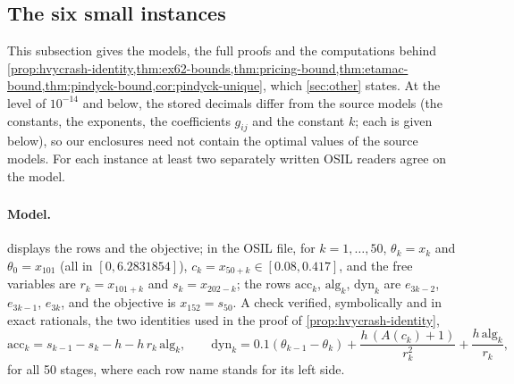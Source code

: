 \subsection{The six small instances}\label{app:small}

This subsection gives the models, the full proofs and the computations behind
\cref{prop:hvycrash-identity,thm:ex62-bounds,thm:pricing-bound,thm:etamac-bound,thm:pindyck-bound,cor:pindyck-unique}, which \cref{sec:other} states.
At the level of $10^{-14}$ and below, the stored decimals differ from the source models (the  constants, the  exponents, the  coefficients $g_{ij}$ and the  constant $k$; each is given below), so our enclosures need not contain the optimal values of the source models.
For each instance at least two separately written OSIL readers agree on the model.

\subsubsection{}\label{app:small-hvycrash}

\paragraph{Model.}
 displays the rows and the objective; in the OSIL file, for $k=1,\dots,50$,
$\theta_k=x_k$ and $\theta_0=x_{101}$ (all in $[0,6.2831854]$), $c_k=x_{50+k}\in[0.08,0.417]$, and the free variables are $r_k=x_{101+k}$ and $s_k=x_{202-k}$;
the rows $\text{acc}_k$, $\text{alg}_k$, $\text{dyn}_k$ are $e_{3k-2}$, $e_{3k-1}$, $e_{3k}$, and the objective is $x_{152}=s_{50}$.
A check verified, symbolically and in exact rationals, the two identities used in the proof of \cref{prop:hvycrash-identity},
\[
\text{acc}_k=s_{k-1}-s_k-h-h\,r_k\,\text{alg}_k,\qquad
\text{dyn}_k=0.1(\theta_{k-1}-\theta_k)+\frac{h\,(A(c_k)+1)}{r_k^2}+\frac{h\,\text{alg}_k}{r_k},
\]
for all 50 stages, where each row name stands for its left side.

